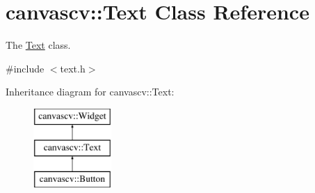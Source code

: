 \hypertarget{classcanvascv_1_1Text}{}\section{canvascv\+:\+:Text Class Reference}
\label{classcanvascv_1_1Text}


The \hyperlink{classcanvascv_1_1Text}{Text} class.  




{\ttfamily \#include $<$text.\+h$>$}

Inheritance diagram for canvascv\+:\+:Text\+:\begin{figure}[H]
\begin{center}
\leavevmode
\includegraphics[height=3.000000cm]{classcanvascv_1_1Text}
\end{center}
\end{figure}
